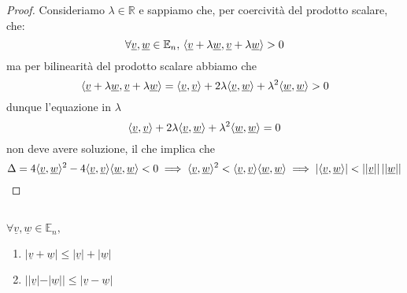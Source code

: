 \begin{proof}
Consideriamo $\lambda \in \mathbb{R}$ e sappiamo che, per coercività del prodotto scalare, che:
$$
\forall \underline{v}, \underline{w} \in \mathbb{E}_n, \, \langle \underline{v} + \lambda \underline{w}, \underline{v} + \lambda \underline{w} \rangle > 0
$$
ma per bilinearità del prodotto scalare abbiamo che
$$
\langle \underline{v} + \lambda \underline{w}, \underline{v} + \lambda \underline{w} \rangle = \langle \underline{v}, \underline{v} \rangle + 2\lambda \langle \underline{v}, \underline{w} \rangle + \lambda^2 \langle \underline{w}, \underline{w} \rangle> 0
$$
dunque l'equazione in $\lambda$
$$
\langle \underline{v}, \underline{v} \rangle + 2\lambda \langle \underline{v}, \underline{w} \rangle + \lambda^2 \langle \underline{w}, \underline{w} \rangle = 0
$$
non deve avere soluzione, il che implica che
$$
\Delta = 4\langle \underline{v}, \underline{w} \rangle^2 - 4 \langle \underline{v}, \underline{v} \rangle \langle \underline{w}, \underline{w} \rangle < 0 \implies \langle \underline{v}, \underline{w} \rangle^2 < \langle \underline{v}, \underline{v} \rangle \langle \underline{w}, \underline{w} \rangle \implies |\langle \underline{v}, \underline{w} \rangle| < ||\underline{v}|| \, ||\underline{w}||
$$
\end{proof}
\begin{prop} \hfill \\
$ \forall \underline{v}, \underline{w} \in \mathbb{E}_n, $
\begin{enumerate}[label=\protect\circled{\arabic*}]
	\item $|\underline{v} + \underline{w}| \leq |\underline{v}| + |\underline{w}|$
	\item $||\underline{v}| - |\underline{w}|| \leq |\underline{v} - \underline{w}|$
\end{enumerate}
\label{prop:dis_triang}
\end{prop}
